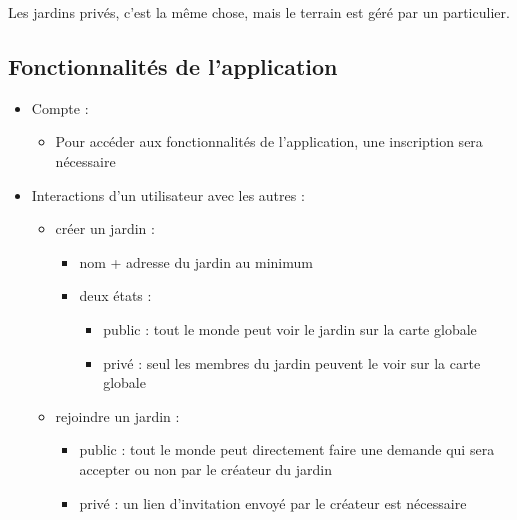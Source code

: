 \documentclass[french,a4paper]{article}
\begin{document}
Les jardins privés, c’est la même chose, mais le terrain est géré par un particulier.
\subsection{Fonctionnalités de l'application}
\begin{itemize}
    \item Compte :
    \begin{itemize}
        \item Pour accéder aux fonctionnalités de l’application, une inscription sera nécessaire
    \end{itemize}
    \item Interactions d’un utilisateur avec les autres : 
    \begin{itemize}
        \item créer un jardin : 
        \begin{itemize}
            \item nom + adresse du jardin au minimum
            \item deux états :
            \begin{itemize}
                \item public : tout le monde peut voir le jardin sur la carte globale
                \item privé : seul les membres du jardin peuvent le voir sur la carte globale
            \end{itemize} 
        \end{itemize}
        \item rejoindre un jardin : 
        \begin{itemize}
            \item public : tout le monde peut directement faire une demande qui sera accepter ou non par le créateur du jardin
            \item privé : un lien d’invitation envoyé par le créateur est nécessaire
        \end{itemize}
        

\end{itemize}
\end{itemize}
\end{document}
